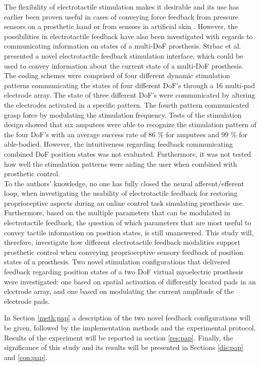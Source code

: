 %
The flexibility of electrotactile stimulation makes it desirable and its use has earlier been proven useful in cases of conveying force feedback from pressure sensors on a prosthetic hand or from sensors in artificial skin \cite{Hartmann2014,Franceschi2015}. However, the possibilities in electrotactile feedback have also been investigated with regards to communicating information on states of a multi-DoF prosthesis. Strbac et al. \cite{Strbac2016} presented a novel electrotactile feedback stimulation interface, which could be used to convey information about the current state of a multi-DoF prosthesis. The coding schemes were comprised of four different dynamic stimulation patterns communicating the states of four different DoF's through a 16 multi-pad electrode array. The state of three different DoF's were communicated by altering the electrodes activated in a specific pattern. The fourth pattern communicated grasp force by modulating the stimulation frequency. Tests of the stimulation design showed that six amputees were able to recognize the stimulation pattern of the four DoF's with an average success rate of 86 \% for amputees and 99 \% for able-bodied. \cite{Strbac2016} However, the intuitiveness regarding feedback communicating combined DoF position states was not evaluated. Furthermore, it was not tested how well the stimulation patterns were aiding the user when combined with prosthetic control.  \\   
%
To the authors' knowledge, no one has fully closed the neural afferent/efferent loop, when investigating the usability of electrotactile feedback for restoring proprioceptive aspects during an online control task simulating prosthesis use. Furthermore, based on the multiple parameters that can be modulated in electrotactile feedback, the question of which parameters that are most useful to convey tactile information on position states, is still unanswered. This study will, therefore, investigate how different electrotactile feedback modalities support prosthetic control when conveying proprioceptive sensory feedback of position states of a prosthesis. Two novel stimulation configurations that delivered feedback regarding position states of a two DoF virtual myoelectric prosthesis were investigated: one based on spatial activation of differently located pads in an electrode array, and one based on modulating the current amplitude of the electrode pads.

In Section \ref{meth:pap} a description of the two novel feedback configurations will be given, followed by the implementation methods and the experimental protocol. Results of the experiment will be reported in section \ref{res:pap}. Finally, the significance of this study and its results will be presented in Sections \ref{dis:pap} and \ref{con:pap}. 
















